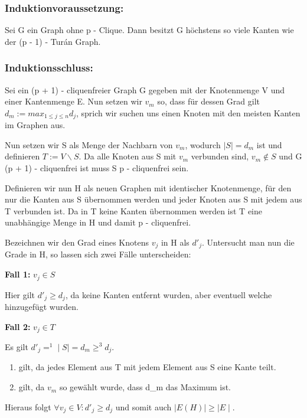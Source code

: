 \documentclass[12pt, a4paper]{article}
\begin{document}
\subsubsection{Induktionvoraussetzung:}

Sei G ein Graph ohne p - Clique. Dann besitzt G höchstens so viele Kanten wie der (p - 1) - Turán Graph.

\subsubsection{Induktionsschluss:}

Sei ein (p + 1) - cliquenfreier Graph G gegeben mit der Knotenmenge V und einer Kantenmenge E. Nun setzen wir $v_m$ so, dass für dessen Grad gilt $d_m := max_{1 \le j \le n} d_j$, sprich wir suchen uns einen Knoten mit den meisten Kanten im Graphen aus.

Nun setzen wir S als Menge der Nachbarn von $v_m$, wodurch $\mid S \mid = d_m$ ist und definieren $T := V \backslash S$. Da alle Knoten aus S mit $v_m$ verbunden sind, $v_m \notin S$ und G (p + 1) - cliquenfrei ist muss S p - cliquenfrei sein.

Definieren wir nun H als neuen Graphen mit identischer Knotenmenge, für den nur die Kanten aus S übernommen werden und jeder Knoten aus S mit jedem aus T verbunden ist. Da in T keine Kanten übernommen werden ist T eine unabhängige Menge in H und damit p - cliquenfrei.

Bezeichnen wir den Grad eines Knotens $v_j$ in H als $d'_j$. Untersucht man nun die Grade in H, so lassen sich zwei Fälle unterscheiden:

\textbf{Fall 1:} $v_j \in S$

Hier gilt $d'_j \ge d_j$, da keine Kanten entfernt wurden, aber eventuell welche hinzugefügt wurden.

\textbf{Fall 2:} $v_j \in T$

Es gilt $d'_j =^1 \mid S \mid = d_m \ge^3 d_j$.
\begin{enumerate}
\item {}
gilt, da jedes Element aus T mit jedem Element aus S eine Kante teilt.

\item {}
gilt, da $v_m$ so gewählt wurde, dass d\_m das Maximum ist.

\end{enumerate}

Hieraus folgt $\forall v_j \in V: d'_j \ge d_j$ und somit auch $\mid E(H) \mid \ge \mid E \mid$.
\end{document}
